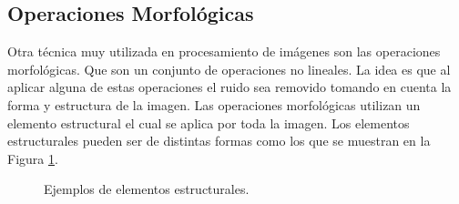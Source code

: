 \subsection{Operaciones Morfológicas}\label{subsec:OperacionesMorfologicas} 

Otra técnica muy utilizada en procesamiento de imágenes son las operaciones morfológicas. Que son un conjunto de operaciones no lineales. La idea es que al aplicar alguna de estas operaciones el ruido sea removido tomando en cuenta la forma y estructura de la imagen. 
Las operaciones morfológicas \citep{Premaratne2013} utilizan un elemento estructural el cual se aplica por toda la imagen. Los elementos estructurales pueden ser de distintas formas como los que se muestran en la Figura \ref{fig:EX}.
\begin{figure}[h!]
\centering
{} \qquad
{} \qquad
{} 
\caption{Ejemplos de elementos estructurales.} \label{fig:EX}
\end{figure} 

